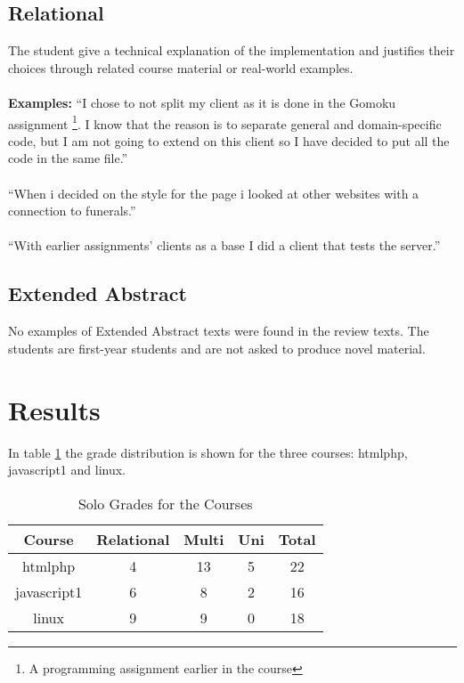 \documentclass[twoside,twocolumn,a4paper,11pt,english]{article}
\begin{document}
\subsection{Relational}

The student give a technical explanation of the implementation and justifies their choices through related course material or real-world examples.
\\
\\
\textbf{Examples:} ``I chose to not split my client as it is done in the Gomoku assignment \footnote{A programming assignment earlier in the course}. I know that the reason is to separate general and domain-specific code, but I am not going to extend on this client so I have decided to put all the code in the same file.''
\\
\\
``When i decided on the style for the page i looked at other websites with a connection to funerals.''
\\
\\
``With earlier assignments' clients as a base I did a client that tests the server.''

\subsection{Extended Abstract}

No examples of Extended Abstract texts were found in the review texts. The students are first-year students and are not asked to produce novel material.




\section{Results}

In table \ref{table:solo} the grade distribution is shown for the three courses: htmlphp, javascript1 and linux.

\begin{table}[H]
\caption{Solo Grades for the Courses}
\centering
\begin{tabular}{c | c c c | c}
Course & Relational & Multi & Uni & Total  \\ [0.5ex] %
\hline
htmlphp & 4 & 13 & 5 & 22 \\
javascript1 & 6 & 8 & 2 & 16\\
linux & 9 & 9 & 0 & 18 \\ [1ex]
\end{tabular}
\label{table:solo}
\end{table}
\end{document}
